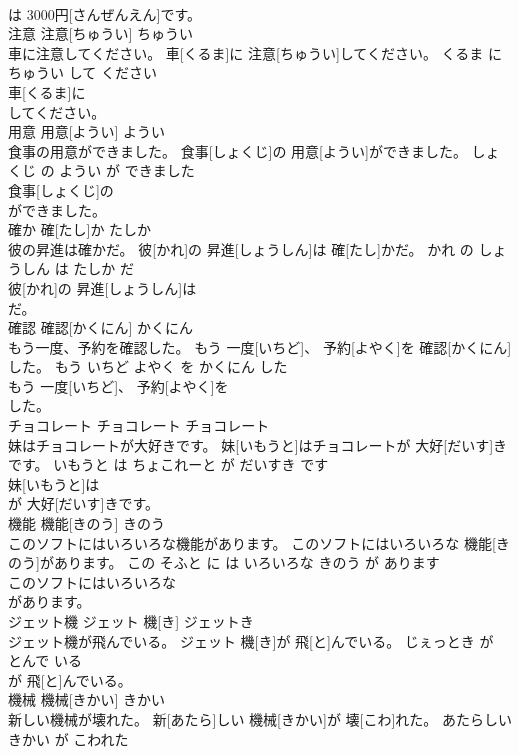 \documentclass[8pt]{extreport}
\begin{document}
\begin{CJK}{UTF8}{min}
\\	は 3000円[さんぜんえん]です。		
\\	注意	注意[ちゅうい]	ちゅうい	
\\	車に注意してください。	車[くるま]に 注意[ちゅうい]してください。	くるま に ちゅうい して ください	
\\	車[くるま]に
\\	してください。		
\\	用意	用意[ようい]	ようい	
\\	食事の用意ができました。	食事[しょくじ]の 用意[ようい]ができました。	しょくじ の ようい が できました	
\\	食事[しょくじ]の
\\	ができました。		
\\	確か	確[たし]か	たしか	
\\	彼の昇進は確かだ。	彼[かれ]の 昇進[しょうしん]は 確[たし]かだ。	かれ の しょうしん は たしか だ	
\\	彼[かれ]の 昇進[しょうしん]は
\\	だ。		
\\	確認	確認[かくにん]	かくにん	
\\	もう一度、予約を確認した。	もう 一度[いちど]、 予約[よやく]を 確認[かくにん]した。	もう いちど よやく を かくにん した	
\\	もう 一度[いちど]、 予約[よやく]を
\\	した。		
\\	チョコレート	チョコレート	チョコレート	
\\	妹はチョコレートが大好きです。	妹[いもうと]はチョコレートが 大好[だいす]きです。	いもうと は ちょこれーと が だいすき です	
\\	妹[いもうと]は
\\	が 大好[だいす]きです。		
\\	機能	機能[きのう]	きのう	
\\	このソフトにはいろいろな機能があります。	このソフトにはいろいろな 機能[きのう]があります。	この そふと に は いろいろな きのう が あります	
\\	このソフトにはいろいろな
\\	があります。		
\\	ジェット機	ジェット 機[き]	ジェットき	
\\	ジェット機が飛んでいる。	ジェット 機[き]が 飛[と]んでいる。	じぇっとき が とんで いる	
\\	が 飛[と]んでいる。		
\\	機械	機械[きかい]	きかい	
\\	新しい機械が壊れた。	新[あたら]しい 機械[きかい]が 壊[こわ]れた。	あたらしい きかい が こわれた	

\end{CJK}
\end{document}
